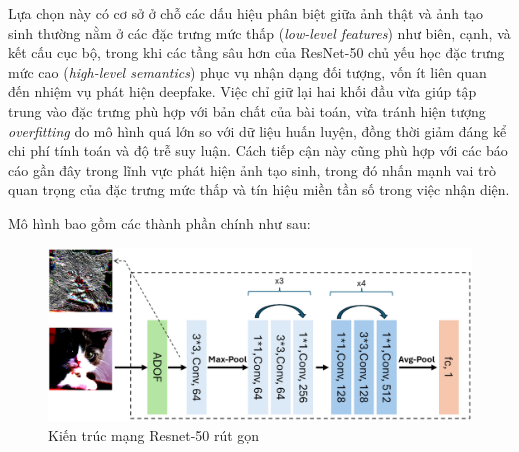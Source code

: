 Lựa chọn này có cơ sở ở chỗ các dấu hiệu phân biệt giữa ảnh thật và ảnh tạo sinh 
thường nằm ở các đặc trưng mức thấp (\textit{low-level features}) như biên, cạnh, và kết cấu cục bộ, 
trong khi các tầng sâu hơn của ResNet-50 chủ yếu học đặc trưng mức cao (\textit{high-level semantics}) 
phục vụ nhận dạng đối tượng, vốn ít liên quan đến nhiệm vụ phát hiện \gls{deepfake}. 
Việc chỉ giữ lại hai khối đầu vừa giúp tập trung vào đặc trưng phù hợp với bản chất của bài toán, 
vừa tránh hiện tượng \textit{overfitting} do mô hình quá lớn so với dữ liệu huấn luyện, 
đồng thời giảm đáng kể chi phí tính toán và độ trễ suy luận. 
Cách tiếp cận này cũng phù hợp với các báo cáo gần đây trong lĩnh vực phát hiện ảnh tạo sinh, 
trong đó nhấn mạnh vai trò quan trọng của đặc trưng mức thấp và tín hiệu miền tần số trong việc nhận diện.

Mô hình bao gồm các thành phần chính như sau:
%
\begin{figure}[h!]
	\centering
	\includegraphics[width=1.0\linewidth]{Images/figure_model_architecture.png}
	\begin{minipage}{1.0\linewidth}
		\vspace{5mm}
		\caption{Kiến trúc mạng Resnet-50 rút gọn}
		\label{fig:figure_model_architecture}
	\end{minipage}
\end{figure}
%
%

